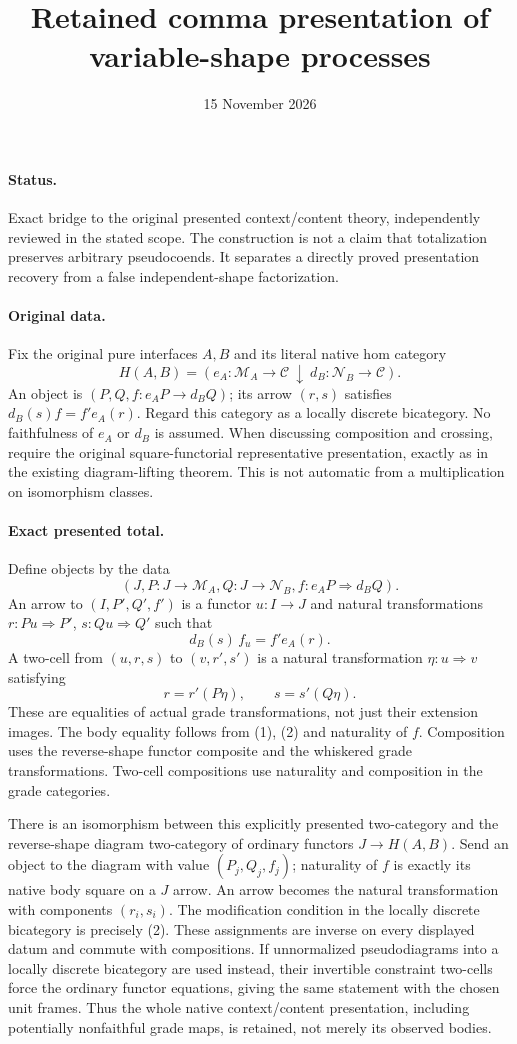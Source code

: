 \documentclass{article}
\title{Retained comma presentation of variable-shape processes}
\date{15 November 2026}
\begin{document}
\maketitle
\paragraph{Status.} Exact bridge to the original presented context/content theory, independently reviewed in the stated scope. The construction is not a claim that totalization preserves arbitrary pseudocoends. It separates a directly proved presentation recovery from a false independent-shape factorization.

\paragraph{Original data.} Fix the original pure interfaces $A,B$ and its literal native hom category
\[
 H(A,B)=(e_A:\mathcal M_A\to\mathcal C\ \downarrow\ d_B:\mathcal N_B\to\mathcal C).
\]
An object is $(P,Q,f:e_AP\to d_BQ)$; its arrow $(r,s)$ satisfies $d_B(s)f=f'e_A(r)$. Regard this category as a locally discrete bicategory. No faithfulness of $e_A$ or $d_B$ is assumed. When discussing composition and crossing, require the original square-functorial representative presentation, exactly as in the existing diagram-lifting theorem. This is not automatic from a multiplication on isomorphism classes.

\paragraph{Exact presented total.} Define objects by the data
\[
 (J,P:J\to\mathcal M_A,Q:J\to\mathcal N_B,
       f:e_AP\Rightarrow d_BQ).
\]
An arrow to $(I,P',Q',f')$ is a functor $u:I\to J$ and natural transformations $r:Pu\Rightarrow P'$, $s:Qu\Rightarrow Q'$ such that
\[
 d_B(s)\,f_u=f'e_A(r).
\tag{1}
\]
A two-cell from $(u,r,s)$ to $(v,r',s')$ is a natural transformation $\eta:u\Rightarrow v$ satisfying
\[
 r=r'(P\eta),\qquad s=s'(Q\eta).
\tag{2}
\]
These are equalities of actual grade transformations, not just their extension images. The body equality follows from (1), (2) and naturality of $f$. Composition uses the reverse-shape functor composite and the whiskered grade transformations. Two-cell compositions use naturality and composition in the grade categories.

There is an isomorphism between this explicitly presented two-category and the reverse-shape diagram two-category of ordinary functors $J\to H(A,B)$. Send an object to the diagram with value $(P_j,Q_j,f_j)$; naturality of $f$ is exactly its native body square on a $J$ arrow. An arrow becomes the natural transformation with components $(r_i,s_i)$. The modification condition in the locally discrete bicategory is precisely (2). These assignments are inverse on every displayed datum and commute with compositions. If unnormalized pseudodiagrams into a locally discrete bicategory are used instead, their invertible constraint two-cells force the ordinary functor equations, giving the same statement with the chosen unit frames. Thus the whole native context/content presentation, including potentially nonfaithful grade maps, is retained, not merely its observed bodies.
\end{document}
